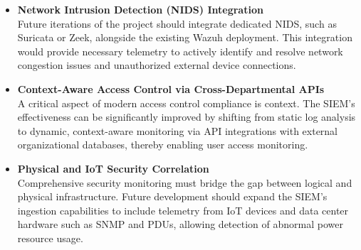 \begin{itemize}
\item \textbf{Network Intrusion Detection (NIDS) Integration}\\
Future iterations of the project should integrate dedicated NIDS, such as Suricata or Zeek, alongside the existing Wazuh deployment. This integration would provide necessary telemetry to actively identify and resolve network congestion issues and unauthorized external device connections.

\item \textbf{Context-Aware Access Control via Cross-Departmental APIs}\\
A critical aspect of modern access control compliance is context. The SIEM's effectiveness can be significantly improved by shifting from static log analysis to dynamic, context-aware monitoring via API integrations with external organizational databases, thereby enabling user access monitoring.

\item \textbf{Physical and IoT Security Correlation}\\
Comprehensive security monitoring must bridge the gap between logical and physical infrastructure. Future development should expand the SIEM's ingestion capabilities to include telemetry from IoT devices and data center hardware such as SNMP and PDUs, allowing detection of abnormal power resource usage.
\end{itemize}

